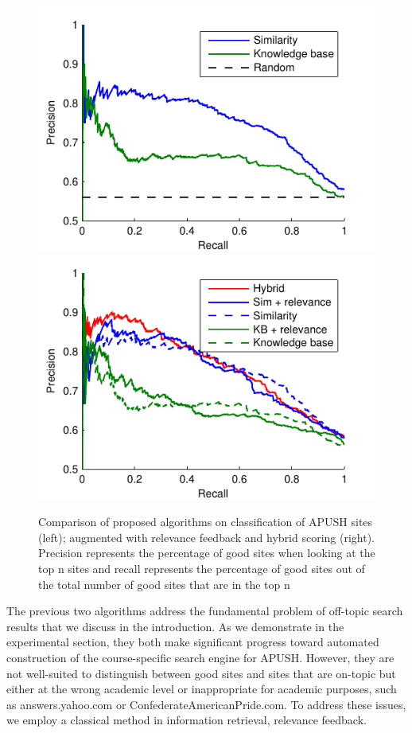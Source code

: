 \documentclass[pdfpagelabels=false,plainpages=true]{acm_proc_article-sp}
\begin{document}
\begin{figure}[t!]
\includegraphics{expt}
\includegraphics{expt_relevance}
\caption{Comparison of proposed algorithms on classification of APUSH
  sites (left); augmented with relevance feedback and hybrid scoring (right).
  Precision represents the percentage of good sites when looking at the
  top n sites and recall represents the percentage of good sites out of the
  total number of good sites that are in the top n } 
\label{fig-expt}
\end{figure}

The previous two algorithms address the fundamental problem of off-topic search
results that we discuss in the introduction. As we demonstrate in the
experimental section, they both make significant progress toward automated
construction of the course-specific search engine for APUSH. However, they are
not well-suited to distinguish between good sites and sites that are on-topic
but either at the wrong academic level or inappropriate for academic purposes,
such as answers.yahoo.com or ConfederateAmericanPride.com. To address these
issues, we employ a classical method in information retrieval, relevance feedback.  
\end{document}
